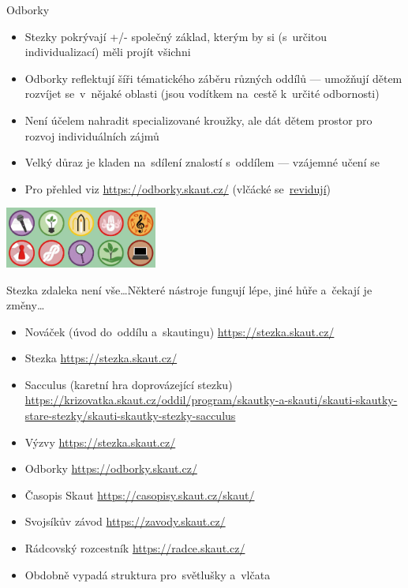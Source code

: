 \documentclass[compress, ucs, xelatex, 11pt, xcolor=dvipsnames, print, aspectratio=169,
	hyperref={
		bookmarks=true,
		unicode=true,
		colorlinks=true,
		pdftitle={Skautska vychovna metoda},
		plainpages=false,
		pdfauthor={Vojtech Zeisek},
		pdfsubject={Skautska vychovna metoda a jeji vyvoj za posledni stoleti a desetileti},
		pdfcreator={XeLaTeX},
		pdfkeywords={Junak, Pedagogika, Skaut, Skauting, Vychovna metoda},
		linkcolor=Red, %
		anchorcolor=ForestGreen, %
		citecolor=ForestGreen, %
		filecolor=ForestGreen, %
		menucolor=ForestGreen, %
		urlcolor=Sepia, %
		pdftex},
	url={hyphens, lowtilde} %
	]{beamer}
\begin{document}
\begin{frame}{Odborky}
	\begin{itemize}
		\item Stezky pokrývají +/- společný základ, kterým by si (s~určitou individualizací) měli projít všichni
		\item Odborky reflektují šíři tématického záběru různých oddílů --- umožňují dětem rozvíjet se~v~nějaké oblasti (jsou vodítkem na~cestě k~určité odbornosti)
		\item Není účelem nahradit specializované kroužky, ale dát dětem prostor pro rozvoj individuálních zájmů
		\item Velký důraz je kladen na~sdílení znalostí s~oddílem --- vzájemné učení se
		\item Pro přehled viz \url{https://odborky.skaut.cz/} (vlčácké se~\href{https://odborky.skaut.cz/vlcci-a-svetylka-revize/}{revidují})
	\end{itemize}
	\begin{center}
		\includegraphics[height=2cm]{odborky.jpg}
	\end{center}
\end{frame}

\begin{frame}{Stezka zdaleka není vše\ldots}{Některé nástroje fungují lépe, jiné hůře a~čekají je změny\ldots}
	\begin{itemize}
		\item Nováček (úvod do~oddílu a~skautingu) \url{https://stezka.skaut.cz/}
		\item Stezka \url{https://stezka.skaut.cz/}
		\item Sacculus (karetní hra doprovázející stezku) \url{https://krizovatka.skaut.cz/oddil/program/skautky-a-skauti/skauti-skautky-stare-stezky/skauti-skautky-stezky-sacculus}
		\item Výzvy \url{https://stezka.skaut.cz/}
		\item Odborky \url{https://odborky.skaut.cz/}
		\item Časopis Skaut \url{https://casopisy.skaut.cz/skaut/}
		\item Svojsíkův závod \url{https://zavody.skaut.cz/}
		\item Rádcovský rozcestník \url{https://radce.skaut.cz/}
		\item Obdobně vypadá struktura pro~světlušky a~vlčata
	\end{itemize}
\end{frame}
\end{document}
